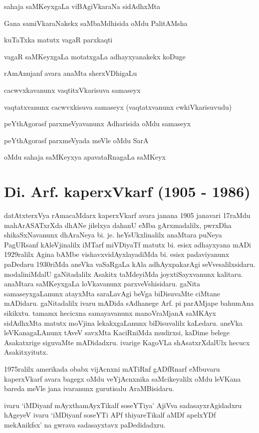 sahaja saMKeyxgaLa viBAgiVkaraNa sidAdhxMta

Gana samiVkaraNakekx saMbaMdhisida oMdu PalitAMsha

kuTaTxka matutx vagaR parxkaqti

vagaR saMKeyxgaLa motatxgaLa adhayxyanakekx koDuge

rAmAnujanf avara anaMta sherxVDhigaLu

cacwvxkavanunx vaqtitxVkarisuva samaseyx

vaqtatxvanunx cacwvxkisuva samaseyx (vaqtatxvanunx cwkiVkarisuvudu)

peYthAgorasf parxmeVyavanunx Adharisida oMdu samaseyx

peYthAgorasf parxmeVyada meVle oMdu SarA

oMdu sahaja saMKeyxya apavataRnagaLa saMKeyx


\section{Di. Arf. kaperxVkarf  (1905 - 1986)}

\vskip -0.2cm

datAtxterxVya rAmacaMdarx kaperxVkarf avara janana {\rm 1905} janavari {\rm 17}raMdu mahArASATxrXda dhANe jilelxya dahanU eMba gArxmadalilx, pwrxDha shikaSxNavanunx dhAraNeya bi. je. heYsUkxlinalilx anaMtara puNeya PagURsanf kAleVjinalilx iMTarf miVDiyaTf matutx bi. esisx adhayxyana mADi {\rm 1929}ralilx Agina bAMbe vishavxvidAyxlayadiMda bi. esisx padaviyanunx paDedaru {\rm 1930}riMda aneVka vaSaRgaLa kAla adhAyxpakarAgi seVvesalilxsidaru. modaliniMdalU gaNitadalilx Asakitx taMdeyiMda joyxtiSayxvanunx kalitaru. anaMtara saMKeyxgaLa loVkavanunx parxveVshisidaru. gaNita samaseyxgaLanunx atayxMta saraLavAgi beVga biDisuvaMte ciMtane mADidaru. gaNitadalilx ivaru mADida sAdhanege Arf. pi parAMjape bahumAna sikikxtu. tamamx hecicxna samayavanunx manoVraMjanA saMKAyx sidAdhxMta matutx moVjina lekakxgaLanunx biDisuvalilx kaLedaru. aneVka leVKanagaLAnunx tAveV savxMta KaciRniMda mudirxsi, kaDime belege Asakatxrige siguvaMte mADidadxru. ivarige KagoVLa shAsatxrXdalUlx hecucx Asakitxyitutx. 

{\rm 1975}ralilx amerikada obabx vijAcnxni mATiRnf gADfRnarf eMbuvaru kaperxVkarf avara bagegx oMdu veYjAcnxnika saMcikeyalilx oMdu leVKana bareda meVle jana ivaranunx gurutisalu AraMBisidaru.

ivaru `iMDiyanf mAyxthamAyxTikalf soseYTiya' AjiVva sadasayxrAgidadxru hAgeyeV ivaru `iMDiyanf soseYTi APf thiyareTikalf aMDf apelxYDf mekAnikfsx' na gwrava sadasayxtavx paDedidadxru.

